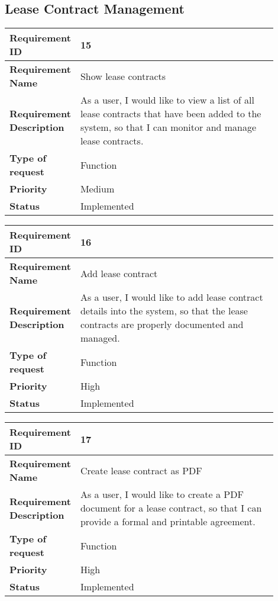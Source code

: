 \newpage
\subsection{Lease Contract Management}
\begin{table}[htbp]
\centering
\begin{tabular}{|m{0.15\linewidth}|m{0.75\linewidth}|}
\hline
\textbf{Requirement ID} & 15 \\
\hline
\textbf{Requirement Name} & Show lease contracts \\
\hline
\textbf{Requirement Description} & As a user, I would like to view a list of all lease contracts that have been added to the system, so that I can monitor and manage lease contracts. \\
\hline
\textbf{Type of request} & Function \\
\hline
\textbf{Priority} & Medium \\
\hline
\textbf{Status} & Implemented \\
\hline
\end{tabular}
\end{table}

\begin{table}[htbp]
\centering
\begin{tabular}{|m{0.15\linewidth}|m{0.75\linewidth}|}
\hline
\textbf{Requirement ID} & 16 \\
\hline
\textbf{Requirement Name} & Add lease contract \\
\hline
\textbf{Requirement Description} & As a user, I would like to add lease contract details into the system, so that the lease contracts are properly documented and managed. \\
\hline
\textbf{Type of request} & Function \\
\hline
\textbf{Priority} & High \\
\hline
\textbf{Status} & Implemented \\
\hline
\end{tabular}
\end{table}

\begin{table}[htbp]
\centering
\begin{tabular}{|m{0.15\linewidth}|m{0.75\linewidth}|}
\hline
\textbf{Requirement ID} & 17 \\
\hline
\textbf{Requirement Name} & Create lease contract as PDF \\
\hline
\textbf{Requirement Description} & As a user, I would like to create a PDF document for a lease contract, so that I can provide a formal and printable agreement. \\
\hline
\textbf{Type of request} & Function \\
\hline
\textbf{Priority} & High \\
\hline
\textbf{Status} & Implemented \\
\hline
\end{tabular}
\end{table}

